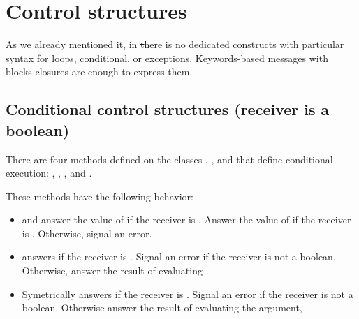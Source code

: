 \documentclass[a4paper,10pt,twoside]{book}
\begin{document}
\section{Control structures}
\label{sec:control}


As we already mentioned it, in \st  there is no dedicated constructs with particular syntax for loops, 
conditional, or exceptions. Keywords-based messages with blocks-closures are enough
to express them. 

\subsection{Conditional control structures (receiver is a boolean)}
\label{sec:conditional}
There are four methods defined on the classes , , and  that define conditional execution: , , , and . 

These methods have the following behavior:

\begin{itemize}
\item {} and  answer the value of  if the receiver is . Answer the value of  if the receiver is . Otherwise, signal an error. 

\item {} answers  if the receiver is . Signal an error 
if the receiver is not a boolean. Otherwise, answer the result of evaluating .

\item 
Symetrically  answers  if the receiver is . Signal an error if the receiver is not a boolean. Otherwise answer the result of evaluating the argument, .
\end{itemize}
\end{document}
